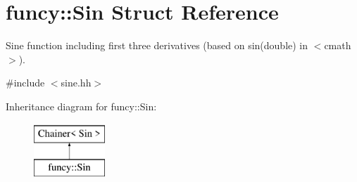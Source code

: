\hypertarget{structfuncy_1_1Sin}{\section{funcy\-:\-:Sin Struct Reference}
\label{structfuncy_1_1Sin}
}


Sine function including first three derivatives (based on sin(double) in $<$cmath$>$).  




{\ttfamily \#include $<$sine.\-hh$>$}

Inheritance diagram for funcy\-:\-:Sin\-:\begin{figure}[H]
\begin{center}
\leavevmode
\includegraphics[height=2.000000cm]{structfuncy_1_1Sin}
\end{center}
\end{figure}
